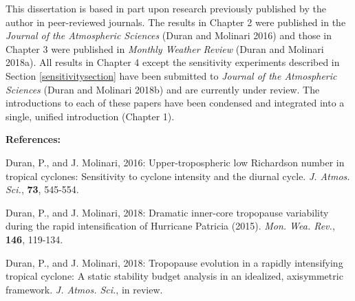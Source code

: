  


\indent \indent This dissertation is based in part upon research previously published by the author in peer-reviewed journals.
The results in Chapter 2 were published in the \textit{Journal of the Atmospheric Sciences} (Duran and Molinari 2016) and those in Chapter 3 were published in \textit{Monthly Weather Review} (Duran and Molinari 2018a).
All results in Chapter 4 except the sensitivity experiments described in Section \ref{sensitivitysection} have been submitted to \textit{Journal of the Atmospheric Sciences} (Duran and Molinari 2018b) and are currently under review.
The introductions to each of these papers have been condensed and integrated into a single, unified introduction (Chapter 1).

\vspace{10mm}

\noindent \textbf{References:}

\noindent Duran, P., and J. Molinari, 2016: Upper-tropospheric low Richardson number in tropical cyclones: Sensitivity to cyclone intensity and the diurnal cycle. \textit{J. Atmos. Sci.}, \textbf{73}, 545-554.

\noindent Duran, P., and J. Molinari, 2018: Dramatic inner-core tropopause variability during the rapid intensification of Hurricane Patricia (2015). \textit{Mon. Wea. Rev.}, \textbf{146}, 119-134.

\noindent Duran, P., and J. Molinari, 2018: Tropopause evolution in a rapidly intensifying tropical cyclone: A static stability budget analysis in an idealized, axisymmetric framework. \textit{J. Atmos. Sci.}, in review.
